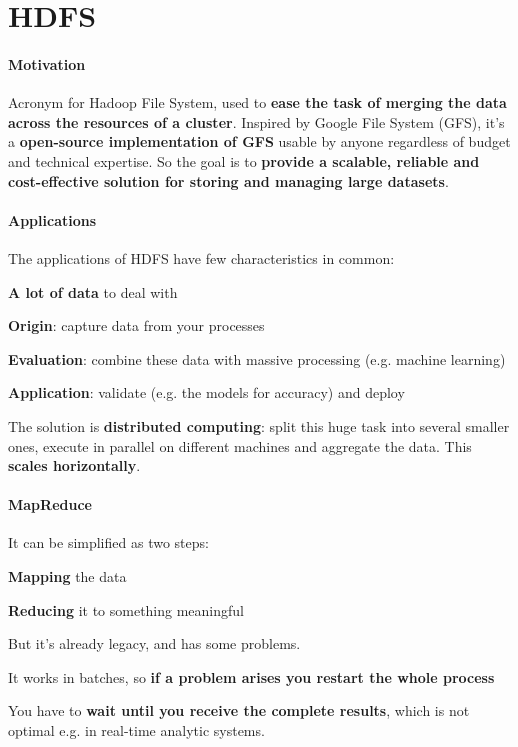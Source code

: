 \documentclass[10pt]{report}
\begin{document}
\section{HDFS}
\paragraph{Motivation} Acronym for Hadoop File System, used to \textbf{ease the task of merging the data across the resources of a cluster}. Inspired by Google File System (GFS), it's a \textbf{open-source implementation of GFS} usable by anyone regardless of budget and technical expertise. So the goal is to \textbf{provide a scalable, reliable and cost-effective solution for storing and managing large datasets}.
\paragraph{Applications} The applications of HDFS have few characteristics in common:
\begin{list}{}{}
	\item \textbf{A lot of data} to deal with
	\item \textbf{Origin}: capture data from your processes
	\item \textbf{Evaluation}: combine these data with massive processing (e.g. machine learning)
	\item \textbf{Application}: validate (e.g. the models for accuracy) and deploy
\end{list}
The solution is \textbf{distributed computing}: split this huge task into several smaller ones, execute in parallel on different machines and aggregate the data. This \textbf{scales horizontally}.
\paragraph{MapReduce} It can be simplified as two steps:
\begin{list}{}{}
	\item \textbf{Mapping} the data
	\item \textbf{Reducing} it to something meaningful
\end{list}
But it's already legacy, and has some problems.
\begin{list}{}{}
	\item It works in batches, so \textbf{if a problem arises you restart the whole process}
	\item You have to \textbf{wait until you receive the complete results}, which is not optimal e.g. in real-time analytic systems.
\end{list}
\end{document}
